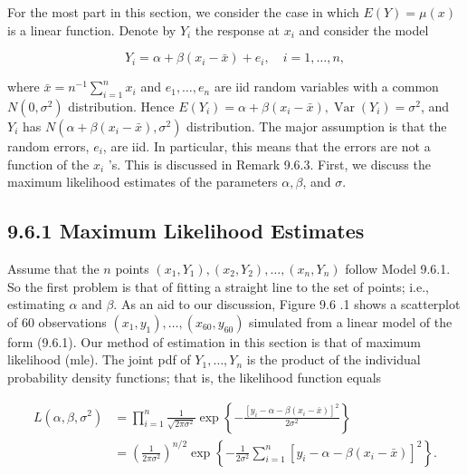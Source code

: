 For the most part in this section, we consider the case in which $E(Y)=\mu(x)$ is a linear function. Denote by $Y_{i}$ the response at $x_{i}$ and consider the model


\begin{equation*}
Y_{i}=\alpha+\beta\left(x_{i}-\bar{x}\right)+e_{i}, \quad i=1, \ldots, n, \tag{9.6.1}
\end{equation*}


where $\bar{x}=n^{-1} \sum_{i=1}^{n} x_{i}$ and $e_{1}, \ldots, e_{n}$ are iid random variables with a common $N\left(0, \sigma^{2}\right)$ distribution. Hence $E\left(Y_{i}\right)=\alpha+\beta\left(x_{i}-\bar{x}\right), \operatorname{Var}\left(Y_{i}\right)=\sigma^{2}$, and $Y_{i}$ has $N\left(\alpha+\beta\left(x_{i}-\bar{x}\right), \sigma^{2}\right)$ distribution. The major assumption is that the random errors, $e_{i}$, are iid. In particular, this means that the errors are not a function of the $x_{i}$ 's. This is discussed in Remark 9.6.3. First, we discuss the maximum likelihood estimates of the parameters $\alpha, \beta$, and $\sigma$.

\subsection*{9.6.1 Maximum Likelihood Estimates}
Assume that the $n$ points $\left(x_{1}, Y_{1}\right),\left(x_{2}, Y_{2}\right), \ldots,\left(x_{n}, Y_{n}\right)$ follow Model 9.6.1. So the first problem is that of fitting a straight line to the set of points; i.e., estimating $\alpha$ and $\beta$. As an aid to our discussion, Figure 9.6 .1 shows a scatterplot of 60 observations $\left(x_{1}, y_{1}\right), \ldots,\left(x_{60}, y_{60}\right)$ simulated from a linear model of the form (9.6.1). Our method of estimation in this section is that of maximum likelihood (mle). The joint pdf of $Y_{1}, \ldots, Y_{n}$ is the product of the individual probability density functions; that is, the likelihood function equals

$$
\begin{aligned}
L\left(\alpha, \beta, \sigma^{2}\right) & =\prod_{i=1}^{n} \frac{1}{\sqrt{2 \pi \sigma^{2}}} \exp \left\{-\frac{\left[y_{i}-\alpha-\beta\left(x_{i}-\bar{x}\right)\right]^{2}}{2 \sigma^{2}}\right\} \\
& =\left(\frac{1}{2 \pi \sigma^{2}}\right)^{n / 2} \exp \left\{-\frac{1}{2 \sigma^{2}} \sum_{i=1}^{n}\left[y_{i}-\alpha-\beta\left(x_{i}-\bar{x}\right)\right]^{2}\right\} .
\end{aligned}
$$

